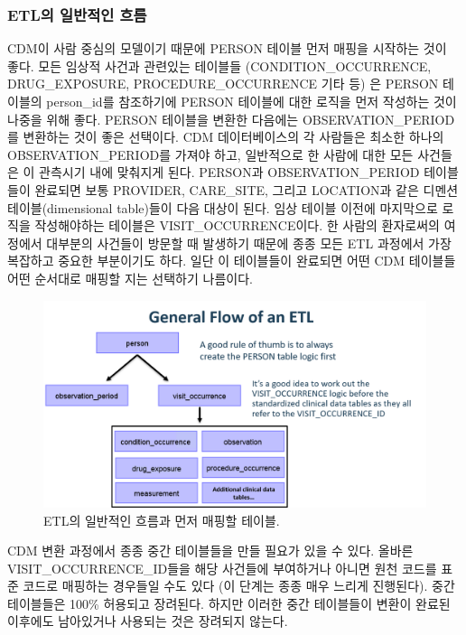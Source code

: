 \documentclass[11pt]{book}
\theoremstyle{definition}
\theoremstyle{definition}
\theoremstyle{definition}
\theoremstyle{remark}
\begin{document}
\subsubsection*{ETL의 일반적인 흐름}\label{etl--}

CDM이 사람 중심의 모델이기 때문에 PERSON 테이블 먼저 매핑을 시작하는
것이 좋다. 모든 임상적 사건과 관련있는 테이블들 (CONDITION\_OCCURRENCE,
DRUG\_EXPOSURE, PROCEDURE\_OCCURRENCE 기타 등) 은 PERSON 테이블의
person\_id를 참조하기에 PERSON 테이블에 대한 로직을 먼저 작성하는 것이
나중을 위해 좋다. PERSON 테이블을 변환한 다음에는 OBSERVATION\_PERIOD를
변환하는 것이 좋은 선택이다. CDM 데이터베이스의 각 사람들은 최소한
하나의 OBSERVATION\_PERIOD를 가져야 하고, 일반적으로 한 사람에 대한 모든
사건들은 이 관측시기 내에 맞춰지게 된다. PERSON과 OBSERVATION\_PERIOD
테이블들이 완료되면 보통 PROVIDER, CARE\_SITE, 그리고 LOCATION과 같은
디멘션 테이블(dimensional table)들이 다음 대상이 된다. 임상 테이블
이전에 마지막으로 로직을 작성해야하는 테이블은 VISIT\_OCCURRENCE이다. 한
사람의 환자로써의 여정에서 대부분의 사건들이 방문할 때 발생하기 때문에
종종 모든 ETL 과정에서 가장 복잡하고 중요한 부분이기도 하다. 일단 이
테이블들이 완료되면 어떤 CDM 테이블들 어떤 순서대로 매핑할 지는 선택하기
나름이다.

\begin{figure}

{\centering \includegraphics[width=1\linewidth]{images/ExtractTransformLoad/flowOfEtl} 

}

\caption{ETL의 일반적인 흐름과 먼저 매핑할 테이블.}\label{fig:etlFlow}
\end{figure}

CDM 변환 과정에서 종종 중간 테이블들을 만들 필요가 있을 수 있다. 올바른
VISIT\_OCCURRENCE\_ID들을 해당 사건들에 부여하거나 아니면 원천 코드를
표준 코드로 매핑하는 경우들일 수도 있다 (이 단계는 종종 매우 느리게
진행된다). 중간 테이블들은 100\% 허용되고 장려된다. 하지만 이러한 중간
테이블들이 변환이 완료된 이후에도 남아있거나 사용되는 것은 장려되지
않는다.
\end{document}

